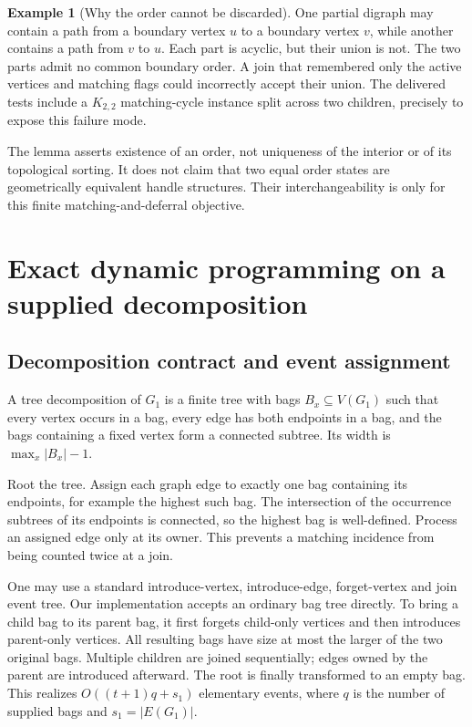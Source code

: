 \documentclass[11pt]{article}
\theoremstyle{definition}\newtheorem{definition}[theorem]{Definition}
\newtheorem{example}[theorem]{Example}
\theoremstyle{remark}\newtheorem{remark}[theorem]{Remark}
\begin{document}
\begin{example}[Why the order cannot be discarded]
One partial digraph may contain a path from a boundary vertex $u$ to a boundary vertex $v$, while another contains a path from $v$ to $u$. Each part is acyclic, but their union is not. The two parts admit no common boundary order. A join that remembered only the active vertices and matching flags could incorrectly accept their union. The delivered tests include a $K_{2,2}$ matching-cycle instance split across two children, precisely to expose this failure mode.
\end{example}

The lemma asserts existence of an order, not uniqueness of the interior or of its topological sorting. It does not claim that two equal order states are geometrically equivalent handle structures. Their interchangeability is only for this finite matching-and-deferral objective.

\section{Exact dynamic programming on a supplied decomposition}
\label{sec:dp}

\subsection{Decomposition contract and event assignment}
A tree decomposition of $G_1$ is a finite tree with bags $B_x\subseteq V(G_1)$ such that every vertex occurs in a bag, every edge has both endpoints in a bag, and the bags containing a fixed vertex form a connected subtree. Its width is $\max_x|B_x|-1$.

Root the tree. Assign each graph edge to exactly one bag containing its endpoints, for example the highest such bag. The intersection of the occurrence subtrees of its endpoints is connected, so the highest bag is well-defined. Process an assigned edge only at its owner. This prevents a matching incidence from being counted twice at a join.

One may use a standard introduce-vertex, introduce-edge, forget-vertex and join event tree. Our implementation accepts an ordinary bag tree directly. To bring a child bag to its parent bag, it first forgets child-only vertices and then introduces parent-only vertices. All resulting bags have size at most the larger of the two original bags. Multiple children are joined sequentially; edges owned by the parent are introduced afterward. The root is finally transformed to an empty bag. This realizes $O((t+1)q+s_1)$ elementary events, where $q$ is the number of supplied bags and $s_1=|E(G_1)|$.
\end{document}
